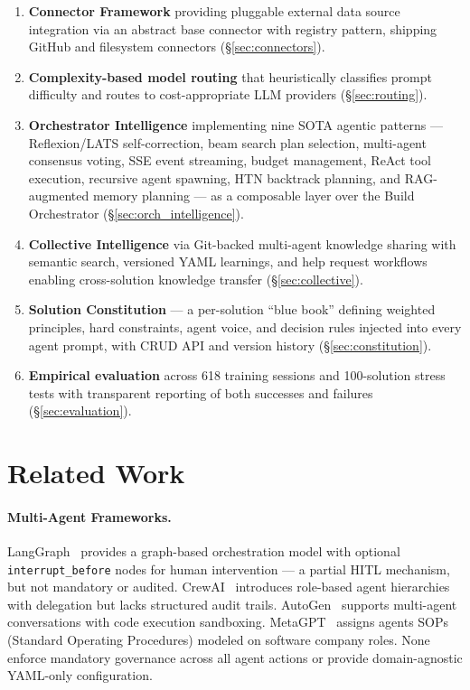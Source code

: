 \documentclass[11pt,a4paper]{article}
\begin{document}
\begin{enumerate}[noitemsep]
    \item \textbf{Connector Framework} providing pluggable external data source integration via an abstract base connector with registry pattern, shipping GitHub and filesystem connectors (\S\ref{sec:connectors}).

    \item \textbf{Complexity-based model routing} that heuristically classifies prompt difficulty and routes to cost-appropriate LLM providers (\S\ref{sec:routing}).

    \item \textbf{Orchestrator Intelligence} implementing nine SOTA agentic patterns --- Reflexion/LATS self-correction, beam search plan selection, multi-agent consensus voting, SSE event streaming, budget management, ReAct tool execution, recursive agent spawning, HTN backtrack planning, and RAG-augmented memory planning --- as a composable layer over the Build Orchestrator (\S\ref{sec:orch_intelligence}).

    \item \textbf{Collective Intelligence} via Git-backed multi-agent knowledge sharing with semantic search, versioned YAML learnings, and help request workflows enabling cross-solution knowledge transfer (\S\ref{sec:collective}).

    \item \textbf{Solution Constitution} --- a per-solution ``blue book'' defining weighted principles, hard constraints, agent voice, and decision rules injected into every agent prompt, with CRUD API and version history (\S\ref{sec:constitution}).

    \item \textbf{Empirical evaluation} across 618 training sessions and 100-solution stress tests with transparent reporting of both successes and failures (\S\ref{sec:evaluation}).
\end{enumerate}

\section{Related Work}
\label{sec:related}

\paragraph{Multi-Agent Frameworks.}
LangGraph~\citep{langgraph2024} provides a graph-based orchestration model with optional \texttt{interrupt\_before} nodes for human intervention --- a partial HITL mechanism, but not mandatory or audited. CrewAI~\citep{crewai2024} introduces role-based agent hierarchies with delegation but lacks structured audit trails. AutoGen~\citep{wu2023autogen} supports multi-agent conversations with code execution sandboxing. MetaGPT~\citep{hong2023metagpt} assigns agents SOPs (Standard Operating Procedures) modeled on software company roles. None enforce mandatory governance across all agent actions or provide domain-agnostic YAML-only configuration.
\end{document}

